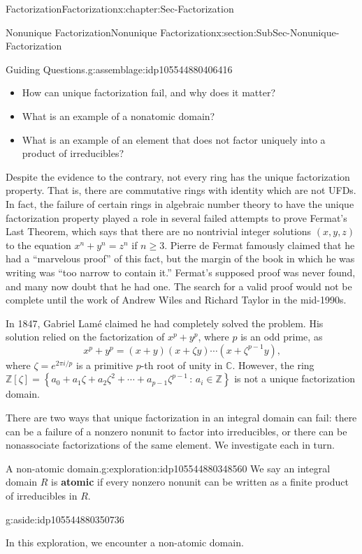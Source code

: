 \documentclass[oneside,10pt,]{book}
\newcommand{\terminology}[1]{\textbf{#1}}
\numberwithin{equation}{section}
\renewcommand{\ge}{\geqslant}
\newcommand{\setof}[2]{{\left\{#1\,\colon\,#2\right\}}}
\def\C{{\mathbb C}}
\def\Z{{\mathbb Z}}
\begin{document}
\begin{chapterptx}{Factorization}{}{Factorization}{}{}{x:chapter:Sec-Factorization}
\begin{sectionptx}{Nonunique Factorization}{}{Nonunique Factorization}{}{}{x:section:SubSec-Nonunique-Factorization}
\begin{assemblage}{Guiding Questions.}{g:assemblage:idp105544880406416}
\begin{itemize}[label=\textbullet]
\item{}How can unique factorization fail, and why does it matter?%
\item{}What is an example of a nonatomic domain?%
\item{}What is an example of an element that does not factor uniquely into a product of irreducibles?%
\end{itemize}
%
\end{assemblage}
Despite the evidence to the contrary, not every ring has the unique factorization property. That is, there are commutative rings with identity which are not UFDs.  In fact, the failure of certain rings in algebraic number theory to have the unique factorization property played a role in several failed attempts to prove Fermat's Last Theorem, which says that there are no nontrivial integer solutions \((x,y,z)\) to the equation \(x^n + y^n = z^n\) if \(n \ge 3\). Pierre de Fermat famously claimed that he had a ``marvelous proof'' of this fact, but the margin of the book in which he was writing was ``too narrow to contain it.'' Fermat's supposed proof was never found, and many now doubt that he had one. The search for a valid proof would not be complete until the work of Andrew Wiles and Richard Taylor in the mid-1990s.%
\par
In 1847, Gabriel Lamé claimed he had completely solved the problem. His solution relied on the factorization of \(x^p + y^p\), where \(p\) is an odd prime, as%
\begin{equation*}
x^p + y^p = (x+y)(x+\zeta y) \cdots (x+\zeta^{p-1}y)\text{,}
\end{equation*}
where \(\zeta = e^{2\pi i/p}\) is a primitive \(p\)-th root of unity in \(\C\). However, the ring \(\Z[\zeta] = \setof{a_0 + a_1 \zeta + a_2 \zeta^2 + \cdots + a_{p-1} \zeta^{p-1}}{a_i\in\Z}\) is not a unique factorization domain.%
\par
There are two ways that unique factorization in an integral domain can fail: there can be a failure of a nonzero nonunit to factor into irreducibles, or there can be nonassociate factorizations of the same element. We investigate each in turn.%
\begin{exploration}{A non-atomic domain.}{g:exploration:idp105544880348560}%
We say an integral domain \(R\) is \terminology{atomic} if every nonzero nonunit can be written as a finite product of irreducibles in \(R\). \begin{aside}{}{g:aside:idp105544880350736}%
\end{aside}
 In this exploration, we encounter a non-atomic domain.%

\end{exploration}
\end{sectionptx}
\end{chapterptx}
\end{document}
